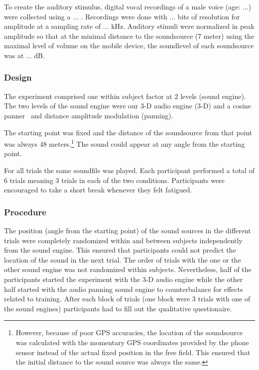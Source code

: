 \documentclass[journal]{IEEEtran}
\begin{document}
To create the auditory stimulus, digital vocal recordings of a male voice (age: ...) were collected using a ... . Recordings were done with ... bits of resolution for amplitude at a sampling rate of ...  kHz. Auditory stimuli were normalized in peak amplitude so that at the minimal distance to the soundsource (7 meter) using the maximal level of volume on the mobile device, the soundlevel of each soundsource was at ... dB. 

\subsubsection{Design}
The experiment comprised one within subject factor at 2 levels (sound engine). The two levels of the sound engine were our 3-D audio engine (3-D) and a cosine panner~\cite{AndyFarnell2010} and distance amplitude modulation (panning).

The starting point was fixed and the distance of the soundsource from that point was always 48 meters.\footnote{However, because of poor GPS accuracies, the location of the soundsource was calculated with the momentary GPS coordinates provided by the phone sensor instead of the actual fixed position in the free field. This ensured that the initial distance to the sound source was always the same.} The sound could appear at any angle from the starting point.

For all trials the same soundfile was played. Each participant performed a total of 6 trials meaning 3 trials in each of the two conditions. Participants were encouraged to take a short break whenever they felt fatigued.

\subsubsection{Procedure}
The position (angle from the starting point) of the sound sources in the different trials were completely randomized within and between subjects independently from the sound engine. This ensured that participants could not predict the location of the sound in the next trial. The order of trials with the one or the other sound engine was not randomized within subjects. Nevertheless, half of the participants started the experiment with the 3-D audio engine while the other half started with the audio panning sound engine to counterbalance for effects related to training. After each block of trials (one block were 3 trials with one of the sound engines) participants had to fill out the qualitative questionaire.
\end{document}
